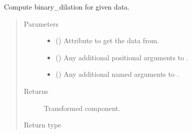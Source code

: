 \documentclass[letterpaper,10pt,english]{sphinxmanual}
\begin{document}
\begin{fulllineitems}
\begin{fulllineitems}
\begin{quote}
\begin{description}
\end{description}\end{quote}

\end{fulllineitems}


\begin{fulllineitems}
\label{\detokenize{api/rock:geology.src.Rock.binary_dilation}}
Compute binary\_dilation for given data.
\begin{quote}\begin{description}
\item[{Parameters}] \leavevmode\begin{itemize}
\item {} 
 (\sphinxstyleliteralemphasis{\sphinxupquote{, }}) \textendash{} Attribute to get the data from.

\item {} 
 () \textendash{} Any additional positional arguments to .

\item {} 
 () \textendash{} Any additional named arguments to .

\end{itemize}

\item[{Returns}] \leavevmode
{} \textendash{} Transformed component.

\item[{Return type}] \leavevmode
{\hyperref[\detokenize{api/base_classes:geology.src.base_spatial.SpatialComponent}]{}}

\end{description}\end{quote}


\end{fulllineitems}
\end{fulllineitems}
\end{document}
